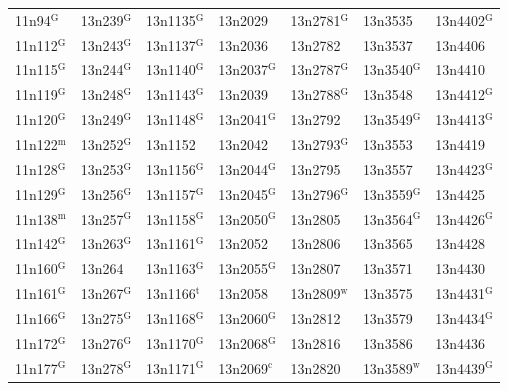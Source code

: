 \documentclass[12pt, oneside]{amsart}
\begin{document}
{\begin{longtable}{*{7}{>{\raggedright\arraybackslash}p{}}}
11n94$^{\mathrm{G}}$ & 13n239$^{\mathrm{G}}$ & 13n1135$^{\mathrm{G}}$ & 13n2029 & 13n2781$^{\mathrm{G}}$ & 13n3535 & 13n4402$^{\mathrm{G}}$ \\
11n112$^{\mathrm{G}}$ & 13n243$^{\mathrm{G}}$ & 13n1137$^{\mathrm{G}}$ & 13n2036 & 13n2782 & 13n3537 & 13n4406 \\
11n115$^{\mathrm{G}}$ & 13n244$^{\mathrm{G}}$ & 13n1140$^{\mathrm{G}}$ & 13n2037$^{\mathrm{G}}$ & 13n2787$^{\mathrm{G}}$ & 13n3540$^{\mathrm{G}}$ & 13n4410 \\
11n119$^{\mathrm{G}}$ & 13n248$^{\mathrm{G}}$ & 13n1143$^{\mathrm{G}}$ & 13n2039 & 13n2788$^{\mathrm{G}}$ & 13n3548 & 13n4412$^{\mathrm{G}}$ \\
11n120$^{\mathrm{G}}$ & 13n249$^{\mathrm{G}}$ & 13n1148$^{\mathrm{G}}$ & 13n2041$^{\mathrm{G}}$ & 13n2792 & 13n3549$^{\mathrm{G}}$ & 13n4413$^{\mathrm{G}}$ \\
11n122$^{\mathrm{m}}$ & 13n252$^{\mathrm{G}}$ & 13n1152 & 13n2042 & 13n2793$^{\mathrm{G}}$ & 13n3553 & 13n4419 \\
11n128$^{\mathrm{G}}$ & 13n253$^{\mathrm{G}}$ & 13n1156$^{\mathrm{G}}$ & 13n2044$^{\mathrm{G}}$ & 13n2795 & 13n3557 & 13n4423$^{\mathrm{G}}$ \\
11n129$^{\mathrm{G}}$ & 13n256$^{\mathrm{G}}$ & 13n1157$^{\mathrm{G}}$ & 13n2045$^{\mathrm{G}}$ & 13n2796$^{\mathrm{G}}$ & 13n3559$^{\mathrm{G}}$ & 13n4425 \\
11n138$^{\mathrm{m}}$ & 13n257$^{\mathrm{G}}$ & 13n1158$^{\mathrm{G}}$ & 13n2050$^{\mathrm{G}}$ & 13n2805 & 13n3564$^{\mathrm{G}}$ & 13n4426$^{\mathrm{G}}$ \\
11n142$^{\mathrm{G}}$ & 13n263$^{\mathrm{G}}$ & 13n1161$^{\mathrm{G}}$ & 13n2052 & 13n2806 & 13n3565 & 13n4428 \\
11n160$^{\mathrm{G}}$ & 13n264 & 13n1163$^{\mathrm{G}}$ & 13n2055$^{\mathrm{G}}$ & 13n2807 & 13n3571 & 13n4430 \\
11n161$^{\mathrm{G}}$ & 13n267$^{\mathrm{G}}$ & 13n1166$^{\mathrm{t}}$ & 13n2058 & 13n2809$^{\mathrm{w}}$ & 13n3575 & 13n4431$^{\mathrm{G}}$ \\
11n166$^{\mathrm{G}}$ & 13n275$^{\mathrm{G}}$ & 13n1168$^{\mathrm{G}}$ & 13n2060$^{\mathrm{G}}$ & 13n2812 & 13n3579 & 13n4434$^{\mathrm{G}}$ \\
11n172$^{\mathrm{G}}$ & 13n276$^{\mathrm{G}}$ & 13n1170$^{\mathrm{G}}$ & 13n2068$^{\mathrm{G}}$ & 13n2816 & 13n3586 & 13n4436 \\
11n177$^{\mathrm{G}}$ & 13n278$^{\mathrm{G}}$ & 13n1171$^{\mathrm{G}}$ & 13n2069$^{\mathrm{c}}$ & 13n2820 & 13n3589$^{\mathrm{w}}$ & 13n4439$^{\mathrm{G}}$ \\

\end{longtable}}
\end{document}

